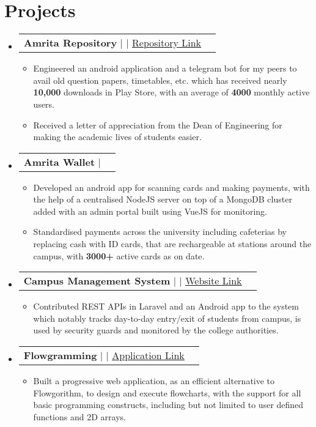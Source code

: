 \documentclass[letterpaper,11pt]{article}
\makeatletter
\newcommand{\resumeItem}[1]{
  \item\small{
    {#1 \vspace{-2pt}}
  }
}
\newcommand{\resumeProjectHeading}[2]{
    \item
    \begin{tabular*}{1.001\textwidth}{l@{\extracolsep{\fill}}r}
      \small#1 & \textbf{\small #2}\\
    \end{tabular*}\vspace{-7pt}
}
\newcommand{\resumeSubHeadingListStart}{\begin{itemize}[leftmargin=0.0in, label={}]}
\newcommand{\resumeSubHeadingListEnd}{\end{itemize}}
\newcommand{\resumeItemListStart}{\begin{itemize}}
\newcommand{\resumeItemListEnd}{\end{itemize}\vspace{-5pt}}
\makeatother
\begin{document}
\section{Projects}
    \vspace{-5pt}
    \resumeSubHeadingListStart
      \resumeProjectHeading
          {\textbf{Amrita Repository} $|$ \text{Android, SQLite, Web Scraping, PHP} $|$ \href{https://github.com/rajkumaar23/amrita-repository}{\underline {Repository Link}}}{}
          \resumeItemListStart
            \resumeItem{Engineered an android application and a telegram bot for my peers to avail old question papers, timetables,  etc.  which has received nearly \textbf{10,000} downloads in Play Store,  with an average of \textbf{4000} monthly active users.}
            \resumeItem{Received a letter of appreciation from the Dean of Engineering for making the academic lives of students easier.}
          \resumeItemListEnd
          \vspace{-13pt}
      \resumeProjectHeading
          {\textbf{Amrita Wallet} $|$ \text{Android, NodeJS, MongoDB, jQuery, PM2}}{}
          \resumeItemListStart
            \resumeItem{Developed an android app for scanning cards and making payments,  with the help of a centralised NodeJS server on top of a MongoDB cluster added with an admin portal built using VueJS for monitoring.}          
            \resumeItem{Standardised payments across the university including cafeterias by replacing cash with ID cards,  that are rechargeable at stations around the campus,  with \textbf{3000+} active cards as on date.}
          \resumeItemListEnd 
          \vspace{-13pt}
          \resumeProjectHeading
          {\textbf{Campus Management System} $|$ \text{PHP, Laravel, MySQL, Android} $|$ \href{https://cms.cb.amrita.edu/humans.txt}{\underline{Website Link}}}{}
          \resumeItemListStart
            \resumeItem{Contributed REST APIs in Laravel and an Android app to the system which notably tracks day-to-day entry/exit of students from campus,  is used by security guards and monitored by the college authorities.}
          \resumeItemListEnd 
          \vspace{-13pt}
          \resumeProjectHeading
          {\textbf{Flowgramming} $|$ \text{HTML, Bootstrap, jQuery,  JointJS} $|$ \href{https://flowgrammers-org.github.io/flowgramming/}{\underline{Application Link}}}{}
          \resumeItemListStart
            \resumeItem{Built a progressive web application,  as an efficient alternative to Flowgorithm,  to design and execute flowcharts,  with the support for all basic programming constructs,  including but not limited to user defined functions and 2D arrays.}
          \resumeItemListEnd 
    \resumeSubHeadingListEnd
\vspace{-15pt}
\end{document}
